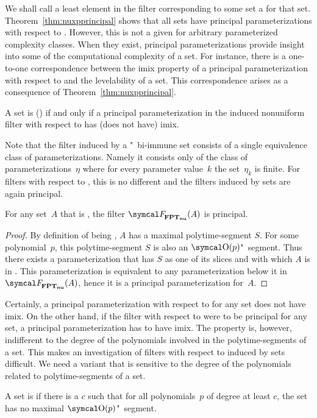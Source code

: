 We shall call a least element in the filter corresponding to some set a  for that set.
Theorem~\ref{thm:nuxpprincipal} shows that all sets have principal parameterizations with respect to .
However, this is not a given for arbitrary parameterized complexity classes.
When they exist, principal parameterizations provide insight into some of the computational complexity of a set.
For instance, there is a one-to-one correspondence between the imix property of a principal parameterization with respect to  and the levelability of a set.
This correspondence arises as a consequence of Theorem~\ref{thm:nuxpprincipal}.
\begin{corollary}
  A set is  () if and only if a principal parameterization in the induced nonuniform filter with respect to  has (does not have) imix.
\end{corollary}

Note that the filter induced by a "~bi-immune set consists of a single equivalence class of parameterizations.
Namely it consists only of the class of parameterizations~$\eta$ where for every parameter value~$k$ the set~$\eta_k$ is finite.
For filters with respect to , this is no different and the filters induced by  sets are again principal.
\begin{theorem}
\label{thm:nufptprincipal}%
  For any set~$A$ that is , the filter $\calF_\clnu{FPT}(A)$ is principal.
\end{theorem}
\begin{proof}
  By definition of being , $A$ has a maximal polytime-segment $S$.
  For some polynomial~$p$, this polytime-segment $S$ is also an $\bigO(p)$"~segment.
  Thus there exists a parameterization that has $S$ as one of its slices and with which $A$ is in .
  This parameterization is equivalent to any parameterization below it in~$\calF_\clnu{FPT}(A)$, hence it is a principal parameterization for~$A$.
\end{proof}
%

Certainly, a principal parameterization with respect to  for any  set does not have imix.
On the other hand, if the filter with respect to  were to be principal for any  set, a principal parameterization has to have imix.
The  property is, however, indifferent to the degree of the polynomials involved in the polytime-segments of a set.
This makes an investigation of filters with respect to  induced by  sets difficult.
We need a variant that is sensitive to the degree of the polynomials related to polytime-segments of a set.
\begin{definition}
  A set is  if there is a $c$ such that for all polynomials~$p$ of degree at least $c$, the set has no maximal $\bigO(p)$"~segment.
\end{definition}

